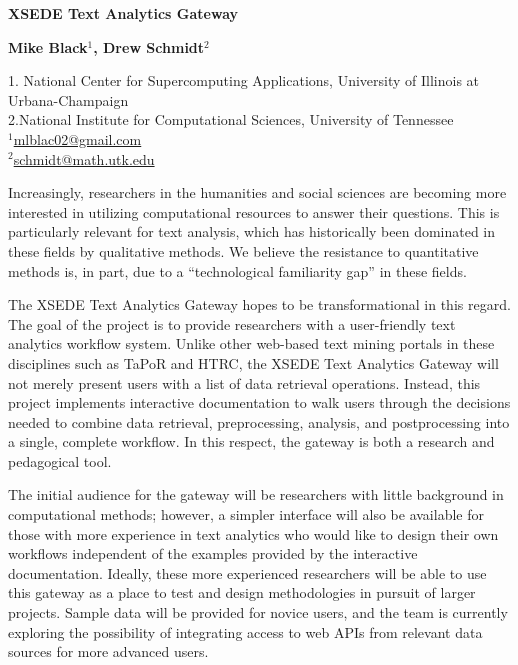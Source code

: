 \documentclass[11pt, a4paper]{article}
\renewcommand{\title}[1]{\begin{center}{\bf \LARGE #1}\end{center}}
\begin{document}
\pagestyle{empty}

\title{XSEDE Text Analytics Gateway}

\begin{center}
  {\bf Mike Black$^1$, Drew Schmidt$^2$}
\end{center}

\begin{affiliations}
1. National Center for Supercomputing Applications, University of Illinois at 
Urbana-Champaign \\[-2pt]
2.National Institute for Computational Sciences, University of Tennessee 
\\[-2pt]
$^1$\underline{mlblac02@gmail.com}\\[-2pt]
$^2$\underline{schmidt@math.utk.edu}\\
\end{affiliations}


\vskip 0.8cm

Increasingly, researchers in the humanities and social sciences are becoming 
more interested in utilizing computational resources to answer their questions. 
 This is particularly relevant for text analysis, which has historically been 
dominated in these fields by qualitative methods.  We believe the resistance to 
quantitative methods is, in part, due to a ``technological familiarity gap'' 
in these fields.

The XSEDE Text Analytics Gateway hopes to be transformational in this regard.  
The goal of the project is to provide researchers with a user-friendly text 
analytics workflow system. Unlike other web-based text mining portals in these 
disciplines such as TaPoR and HTRC, the XSEDE Text Analytics Gateway will not 
merely present users with a list of data retrieval operations. Instead, this 
project implements interactive documentation to walk users through the decisions 
needed to combine data retrieval, preprocessing, analysis, and postprocessing 
into a single, complete workflow. In this respect, the gateway is both a 
research and pedagogical tool. 

The initial audience for the gateway will be researchers with little background 
in computational methods; however, a simpler interface will also be available 
for those with more experience in text analytics who would like to design their 
own workflows independent of the examples provided by the interactive 
documentation. Ideally, these more experienced researchers will be able to use 
this gateway as a place to test and design methodologies in pursuit of larger 
projects. Sample data will be provided for novice users, and the team is 
currently exploring the possibility of integrating access to web APIs from 
relevant data sources for more advanced users.
\end{document}
